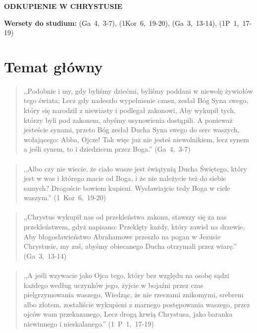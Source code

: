 \documentclass[10pt,a4paper,oneside]{article}
\begin{document}
\centerline{\textbf{\MakeUppercase{Odkupienie w Chrystusie}}}
\begin{center}
\textbf{Wersety do studium:} \mbox{(Ga 4, 3-7)}, \mbox{(1Kor 6, 19-20)}, \mbox{(Ga 3, 13-14)}, \mbox{(1P 1, 17-19)}
\end{center}
\section{Temat główny}
\paragraph{}
\begin{quote}
,,Podobnie i my, gdy byliśmy dziećmi, byliśmy poddani w niewolę żywiołów tego świata; Lecz gdy nadeszło wypełnienie czasu, zesłał Bóg Syna swego, który się narodził z niewiasty i podlegał zakonowi, Aby wykupił tych, którzy byli pod zakonem, abyśmy usynowienia dostąpili. A ponieważ jesteście synami, przeto Bóg zesłał Ducha Syna swego do serc waszych, wołającego: Abba, Ojcze! Tak więc już nie jesteś niewolnikiem, lecz synem a jeśli synem, to i dziedzicem przez Boga.'' \mbox{(Ga 4, 3-7)}
\end{quote}
\paragraph{}
\begin{quote}
,,Albo czy nie wiecie, że ciało wasze jest świątynią Ducha Świętego, który jest w was i którego macie od Boga, i że nie należycie też do siebie samych? Drogoście bowiem kupieni. Wysławiajcie tedy Boga w ciele waszym.'' \mbox{(1 Kor 6, 19-20)}
\end{quote}
\paragraph{}
\begin{quote}
,,Chrystus wykupił nas od przekleństwa zakonu, stawszy się za nas przekleństwem, gdyż napisano: Przeklęty każdy, który zawisł na drzewie, Aby błogosławieństwo Abrahamowe przeszło na pogan w Jezusie Chrystusie, my zaś, abyśmy obiecanego Ducha otrzymali przez wiarę.'' \mbox{(Ga 3, 13-14)}
\end{quote}
\paragraph{}
\begin{quote}
,,A jeśli wzywacie jako Ojca tego, który bez względu na osobę sądzi każdego według uczynków jego, żyjcie w bojaźni przez czas pielgrzymowania waszego, Wiedząc, że nie rzeczami znikomymi, srebrem albo złotem, zostaliście wykupieni z marnego postępowania waszego, przez ojców wam przekazanego, Lecz drogą krwią Chrystusa, jako baranka niewinnego i nieskalanego.'' \mbox{(1 P 1, 17-19)}
\end{quote}
\end{document}
